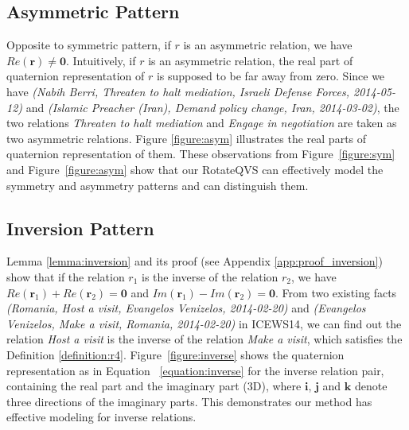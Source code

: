 \documentclass[11pt]{article}
\newcommand{\vect}[1]{\mathbf{#1}\xspace}
\newcommand{\vecti}{\vect{i}\xspace}
\newcommand{\vectj}{\vect{j}\xspace}
\newcommand{\vectk}{\vect{k}\xspace}
\newcommand{\vectr}{\vect{r}\xspace}
\begin{document}
\subsection{Asymmetric Pattern}
Opposite to symmetric pattern, if $r$ is an asymmetric relation, we have
$Re(\vectr)\neq \vect{0}$.
Intuitively, if $r$ is an asymmetric relation, the real part of quaternion representation of $r$ is supposed to be far away from zero.
Since we have \textit{(Nabih Berri, Threaten to halt mediation, Israeli Defense Forces, 2014-05-12)} and \textit{(Islamic Preacher (Iran), Demand policy change, Iran, 2014-03-02)}, the two relations \textit{Threaten to halt mediation} and \textit{Engage in negotiation} are taken as two asymmetric relations.
Figure \ref{figure:asym} illustrates the real parts of quaternion representation of them.
These observations from Figure~\ref{figure:sym} and Figure~\ref{figure:asym} show that our RotateQVS can effectively model the symmetry and asymmetry patterns and can distinguish them.

\subsection{Inversion Pattern}

Lemma \ref{lemma:inversion} and its proof (see Appendix \ref{app:proof_inversion}) show that if the relation $r_1$ is the inverse of the relation $r_2$, we have $Re(\vect{r}_1) + Re(\vect{r}_2) = \vect{0}$ and $Im(\vect{r}_1) - Im(\vect{r}_2) = \vect{0}$.
From two existing facts \textit{(Romania, Host a visit, Evangelos Venizelos, 2014-02-20)} and \textit{(Evangelos Venizelos, Make a visit, Romania, 2014-02-20)} in ICEWS14, we can find out the relation \textit{Host a visit} is the inverse of the relation \textit{Make a visit}, which satisfies the Definition \ref{definition:r4}.
Figure~\ref{figure:inverse} shows the quaternion representation as in Equation~ \ref{equation:inverse} for the inverse relation pair, containing the real part and the imaginary part (3D), where $\vecti$, $\vectj$ and $\vectk$ denote three directions of the imaginary parts.
This demonstrates our method has effective modeling for inverse relations.
\end{document}

